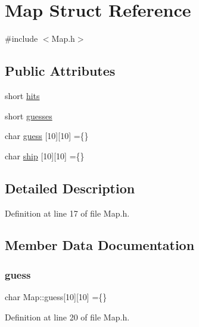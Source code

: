 \hypertarget{struct_map}{}\section{Map Struct Reference}
\label{struct_map}


{\ttfamily \#include $<$Map.\+h$>$}

\subsection*{Public Attributes}
\begin{DoxyCompactItemize}
\item 
short \hyperlink{struct_map_a4b81caa9d402a8edc30fb93869e7163e}{hits}
\item 
short \hyperlink{struct_map_a77bf60eb6e41fce7ee5ebd7582372a28}{guesses}
\item 
char \hyperlink{struct_map_a60684c774a0cb6da010399a63366b1ba}{guess} \mbox{[}10\mbox{]}\mbox{[}10\mbox{]} =\{\}
\item 
char \hyperlink{struct_map_a95d68a52f9a8a7c50c45e9ef63fe9a64}{ship} \mbox{[}10\mbox{]}\mbox{[}10\mbox{]} =\{\}
\end{DoxyCompactItemize}


\subsection{Detailed Description}


Definition at line 17 of file Map.\+h.



\subsection{Member Data Documentation}
\mbox{\label{struct_map_a60684c774a0cb6da010399a63366b1ba}} 
\subsubsection{\texorpdfstring{guess}{guess}}
{\footnotesize\ttfamily char Map\+::guess\mbox{[}10\mbox{]}\mbox{[}10\mbox{]} =\{\}}



Definition at line 20 of file Map.\+h.

\mbox{\label{struct_map_a77bf60eb6e41fce7ee5ebd7582372a28}} 
